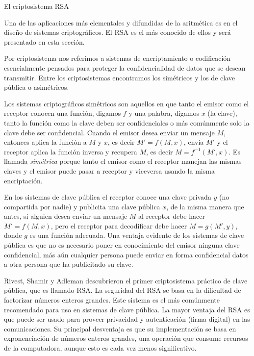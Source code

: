 \begin{section}{El criptosistema RSA}\label{seccion-el-criptosistema-rsa}


Una de las aplicaciones más elementales y difundidas de la aritmética es en el diseño de sistemas criptográficos. El RSA es el más conocido de ellos y será presentado en esta sección. 

Por criptosistema nos referimos a sistemas de encriptamiento o codificación esencialmente pensados para proteger la    confidencialidad de datos que
se desean transmitir. Entre los criptosistemas encontramos los simétricos  y los de clave pública o asimétricos.
  

Los sistemas criptográficos simétricos son aquellos en que tanto el emisor como el receptor conocen una función, digamos $f$ y una palabra, digamos $x$ (la clave), tanto la función como la clave 
deben ser confidenciales o más comúnmente solo la clave debe ser confidencial. Cuando el emisor desea enviar un mensaje $M$, entonces aplica la función a $M$ y $x$, es decir $M'=f(M,x)$,
envía $M'$ y el receptor aplica la función inversa y recupera $M$, es decir $M=f^{-1}(M',x)$. Es llamada \emph{simétrica} porque tanto el emisor como el receptor manejan las mismas claves y el emisor puede pasar a receptor y viceversa usando la misma encriptación.   

En los sistemas de clave pública el receptor conoce una clave privada $y$ (no compartida por nadie) y publicita una clave pública $x$, de la misma manera que antes,  si alguien desea enviar un mensaje $M$ al receptor debe hacer $M'=f(M,x)$, pero el receptor para decodificar debe hacer $M=g(M',y)$, donde $g$ es una función adecuada. Una ventaja evidente de los sistemas de clave pública es que no es necesario poner en conocimiento del emisor ninguna clave confidencial, más aún cualquier persona puede enviar en forma confidencial datos a otra persona que ha publicitado su clave.


Rivest, Shamir y Adleman descubrieron el primer criptosistema práctico de clave pública, que es llamado RSA. La seguridad del RSA se basa en la dificultad de factorizar números enteros grandes. Este sistema es el más comúnmente recomendado para uso en sistemas de clave pública. La mayor ventaja del RSA es que puede ser usado para proveer privacidad y autenticación (firma digital) en las comunicaciones. Su principal desventaja es que su implementación se basa en exponenciación de números enteros grandes, una operación que consume recursos de la computadora, aunque esto es cada vez menos significativo.


\end{section}
